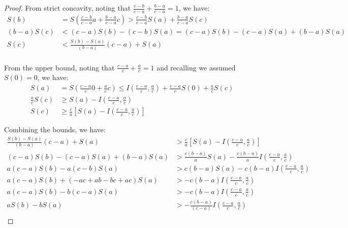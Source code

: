 \begin{mathSection}
\begin{proof}
	From strict concavity, noting that $\frac{c-b}{c-a} + \frac{b-a}{c-a} = 1$, we have:
	\begin{equation}
		\begin{aligned}
			S(b) &= S\left(\frac{c-b}{c-a} a + \frac{b-a}{c-a} c\right) > \frac{c-b}{c-a} S(a) + \frac{b-a}{c-a} S(c)\\
			(b-a)S(c) &< (c-a) S(b) - (c-b) S(a) = (c-a) S(b) - (c-a) S(a) + (b-a) S(a) \\
			S(c) &< \frac{S(b) - S(a)}{(b-a)} (c-a) + S(a) \\
		\end{aligned}
	\end{equation}
	
	From the upper bound, noting that $\frac{c-a}{c} + \frac{a}{c} = 1$ and recalling we assumed $S(0) = 0$, we have:
	\begin{equation}
		\begin{aligned}
			S(a) &= S\left(\frac{c-a}{c} 0 + \frac{a}{c} c\right) \leq I\left(\frac{c-a}{c}, \frac{a}{c}\right) + \frac{c-a}{c} S(0) +\frac{a}{c} S(c) \\
			\frac{a}{c} S(c) &\geq S(a) - I\left(\frac{c-a}{c}, \frac{a}{c}\right) \\
			S(c) &\geq \frac{c}{a} \left[ S(a) - I\left(\frac{c-a}{c}, \frac{a}{c}\right) \right]
		\end{aligned}
	\end{equation}
	
	Combining the bounds, we have:
	\begin{equation}
		\begin{aligned}
			\frac{S(b) - S(a)}{(b-a)} (c-a) + S(a) &> \frac{c}{a} \left[ S(a) - I\left(\frac{c-a}{c}, \frac{a}{c}\right) \right] \\
			(c-a) S(b) - (c-a)S(a) + (b-a) S(a) &> \frac{c(b-a)}{a} S(a) - \frac{c(b-a)}{a} I\left(\frac{c-a}{c}, \frac{a}{c}\right) \\
			a (c-a) S(b) - a(c-b) S(a) &> c(b-a)S(a) - c(b-a) I\left(\frac{c-a}{c}, \frac{a}{c}\right) \\
			a (c-a) S(b) + (-ac +ab -bc +ac) S(a) &> - c(b-a) I\left(\frac{c-a}{c}, \frac{a}{c}\right) \\
			a (c-a) S(b) -b (c-a) S(a) &> - c(b-a) I\left(\frac{c-a}{c}, \frac{a}{c}\right) \\
			a  S(b) - b S(a) &> - \frac{c(b-a)}{(c-a)} I\left(\frac{c-a}{c}, \frac{a}{c}\right) \\
		\end{aligned}
	\end{equation}
	

\end{proof}
\end{mathSection}
